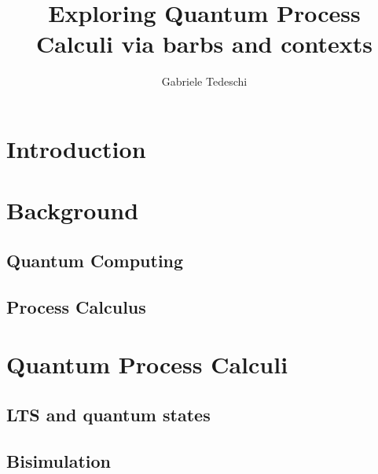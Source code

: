 \documentclass[10pt,a4paper, titlepage]{report}
\title{Exploring Quantum Process Calculi via barbs and contexts }
\author{Gabriele Tedeschi}
\begin{document}
\maketitle

\tableofcontents

\chapter{Introduction}

\chapter{Background}

\section{Quantum Computing}


\section{Process Calculus}

	





\chapter{Quantum Process Calculi}



\section{LTS and quantum states}


\section{Bisimulation}

\end{document}
